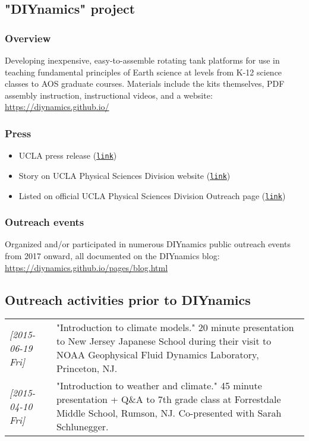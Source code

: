 \documentclass[12pt,letterpaper]{shillcv}
\begin{document}
\subsection*{"DIYnamics" project}
\label{sec:org0043227}
\subsubsection*{Overview}
\label{sec:org5643b19}
Developing inexpensive, easy-to-assemble rotating tank platforms for use in
teaching fundamental principles of Earth science at levels from K-12 science
classes to AOS graduate courses.  Materials include the kits themselves, PDF
assembly instruction, instructional videos, and a website:
\url{https://diynamics.github.io/}

\subsubsection*{Press}
\label{sec:org43b2563}
\begin{itemize}
\item UCLA press release (\href{http://newsroom.ucla.edu/releases/a-50-do-it-yourself-device-designed-at-ucla-makes-science-fun-for-students-of-all-ages}{\texttt{link}})
\item Story on UCLA Physical Sciences Division website (\href{https://www.physicalsciences.ucla.edu/spinlab/}{\texttt{link}})
\item Listed on official UCLA Physical Sciences Division Outreach page (\href{https://www.physicalsciences.ucla.edu/outreach/}{\texttt{link}})
\end{itemize}

\subsubsection*{Outreach events}
\label{sec:org06f60ed}
Organized and/or participated in numerous DIYnamics public outreach events from
2017 onward, all documented on the DIYnamics blog: \url{https://diynamics.github.io/pages/blog.html}
\subsection*{Outreach activities prior to DIYnamics}
\label{sec:org378e616}
\begin{center}
\begin{tabularx}{\textwidth}{lX}
\textit{[2015-06-19 Fri]} & "Introduction to climate models."  20 minute presentation to New Jersey Japanese School during their visit to NOAA Geophysical Fluid Dynamics Laboratory, Princeton, NJ.\\
\textit{[2015-04-10 Fri]} & "Introduction to weather and climate."  45 minute presentation + Q\&A to 7th grade class at Forrestdale Middle School, Rumson, NJ.  Co-presented with Sarah Schlunegger.\\
\end{tabularx}
\end{center}
\end{document}
